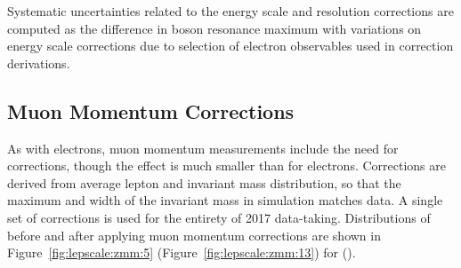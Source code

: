 Systematic uncertainties related to the energy scale and resolution corrections are computed as the difference in \Z boson resonance maximum with variations on energy scale corrections due to selection of electron observables used in correction derivations. 



\subsection{Muon Momentum Corrections}
As with electrons, muon momentum measurements include the need for corrections, though the effect is much smaller than for electrons. Corrections are derived from average lepton \pt and \zmm invariant mass distribution, so that the maximum and width of the \zmm invariant mass in simulation matches data\cite{Bodek:2012id}.  A single set of corrections is used for the entirety of 2017 data-taking. Distributions of \zmm \mll before and after applying muon momentum corrections are shown in Figure~\ref{fig:lepscale:zmm:5} (Figure~\ref{fig:lepscale:zmm:13}) for \serag (\serah).






